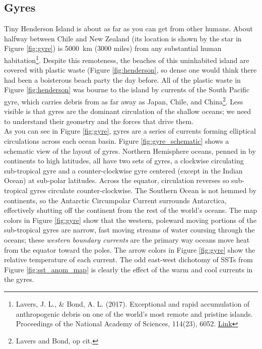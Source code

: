 \documentclass[amstex,12pt]{book}
\begin{document}
{\subsection{Gyres}\label{gyres}
Tiny Henderson Island is about as far as you can get from other humans. About halfway between Chile and New Zealand (its location is shown by the star in Figure \ref{fig:gyre}) is \SI{5000}{\kilo\metre} (3000 miles) from any substantial human habitation\footnote{Lavers, J. L., \& Bond, A. L. (2017). Exceptional and rapid accumulation of anthropogenic debris on one of the world’s most remote and pristine islands. Proceedings of the National Academy of Sciences, 114(23), 6052. \href{https://doi.org/10.1073/pnas.1619818114}{Link}}. Despite this remoteness, the beaches of this uninhabited island are covered with plastic waste (Figure \ref{fig:henderson}, so dense one would think there had been a boisterous beach party the day before. All of the plastic waste in Figure \ref{fig:henderson} was bourne to the island by currents of the South Pacific gyre, which carries debris from as far away as Japan, Chile, and China\footnote{Lavers and Bond, op cit.}. Less visible is that gyres are the dominant circulation of the shallow oceans; we need to understand their geometry and the forces that drive them.\\
As you can see in Figure \ref{fig:gyre}, gyres are a series of currents forming elliptical circulations across each ocean basin. Figure \ref{fig:gyre_schematic} shows a schematic view of the layout of gyres. Northern Hemisphere oceans, penned in by continents to high latitudes, all have two sets of gyres, a clockwise circulating sub-tropical gyre and a counter-clockwise gyre centered (except in the Indian Ocean) at sub-polar latitudes. Across the equator, circulation reverses so sub-tropical gyres circulate counter-clockwise. The Southern Ocean is not hemmed by continents, so the Antarctic Circumpolar Current surrounds Antarctica, effectively shutting off the continent from the rest of the world's oceans. The map colors in Figure \ref{fig:gyre} show that the western, poleward moving portions of the sub-tropical gyres are narrow, fast moving streams of water coursing through the oceans; these \emph{western boundary currents} are the primary way oceans move heat from the equator toward the poles. The arrow colors in Figure \ref{fig:gyre} show the relative temperature of each current. The odd east-west dichotomy of SSTs from Figure \ref{fig:sst_anom_map} is clearly the effect of the warm and cool currents in the gyres.\\

}
\end{document}
